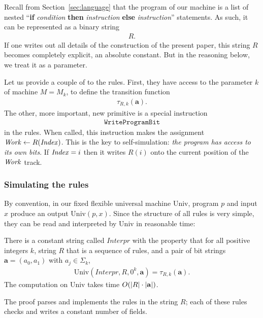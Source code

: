 \documentclass[11pt]{memoir}
\theoremstyle{definition} %
\renewcommand{\vek}[1]{\mathbf{#1}}
\newcommand{\fld}[1]{\ensuremath{\textit{#1\/}}}
\newcommand{\rul}[1]{\ensuremath{\texttt{#1}}}
\newcommand{\va}{\vek{a}}
\newcommand{\Index}{\fld{Index}}
\newcommand{\Work}{\fld{Work}}
\newcommand{\Interpr}{\mathit{Interpr}}
\newcommand{\Un}{\mathrm{Univ}}
\newcommand{\WriteProgramBit}{\rul{WriteProgramBit}}
\begin{document}
Recall from Section~\ref{sec:language} that the program
of our machine is a list of nested
``\textbf{if} \emph{condition} \textbf{then} \emph{instruction}
\textbf{else} \emph{instruction}''
statements.
As such, it can be represented as a binary string 
 \begin{align*}
   R.
 \end{align*}
If one writes out all details of the construction of the present paper, this string \( R \)
becomes completely explicit, an absolute constant.
But in the reasoning below, we treat it as a parameter.

Let us provide a couple of  to the rules.
First, they have access to the parameter \( k \) of machine \( M=M_{k} \), 
to define the transition function
 \begin{align*}
            \tau_{R,k}(\va).
 \end{align*}
The other, more important, new primitive is a special instruction
 \begin{align*}
   \WriteProgramBit
 \end{align*}
in the rules.
When called, this instruction makes the assignment \( \Work\gets R(\Index) \).
This is the key to self-simulation: \emph{the program has
access to its own bits}.
If \( \Index=i \) then it writes \( R(i) \) onto the current position of the \( \Work \) track.


\subsubsection{Simulating the rules}

By convention, in our fixed flexible universal machine \( \Un \),
program \( p \) and input \( x \) produce an output \( \Un(p,x) \).
Since the structure of all rules is very simple, they can be read and
interpreted by \( \Un \) in reasonable time:

\begin{theorem}
There is a constant string called \( \Interpr \) with the property that for
all positive integers \( k \), string \( R \) that is a
sequence of rules, and a pair of bit strings \( \va=(a_{0},a_{1}) \) with \( a_{j}\in\Sigma_{k} \),
 \begin{align*}
  \Un(\Interpr,R,0^{k},\va)=\tau_{R,k}(\va).
 \end{align*}
The computation on \( \Un \) takes time \( O(\abs{R}\cdot \abs{\va}) \).
\end{theorem}

The proof parses and implements the rules in the string \( R \); each of these rules
checks and writes a constant number of fields.
\end{document}
